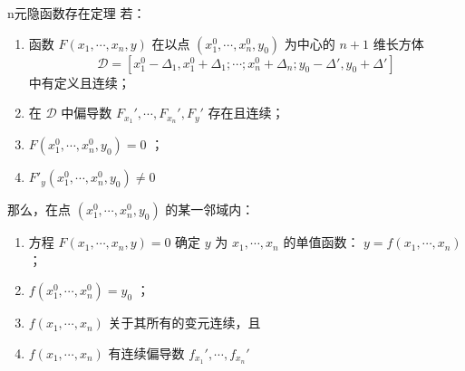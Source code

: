 \begin{theorem}{n元隐函数存在定理}\label{the_Mulmp_1}
若：\begin{enumerate}
\item 函数 $F(x_1,\cdots,x_n,y)$ 在以点 $(x_1^0,\cdots,x_n^0,y_0)$ 为中心的 $n+1$ 维长方体
\begin{equation}
\mathcal{D}=[x_1^0-\Delta_1,x_1^0+\Delta_1;\cdots;x_n^0+\Delta_n;y_0-\Delta',y_0+\Delta']
\end{equation}
中有定义且连续；
\item 在 $\mathcal{D}$ 中偏导数 $F_{x_1}',\cdots,F_{x_n}',F_y'$ 存在且连续；
\item $F(x_1^0,\cdots,x_n^0,y_0)=0$ ；
\item $F'_y(x_1^0,\cdots,x_n^0,y_0)\neq 0$
\end{enumerate}
那么，在点 $(x_1^0,\cdots,x_n^0,y_0)$ 的某一邻域内：
\begin{enumerate}
\item 方程 $F(x_1,\cdots,x_n,y)=0$ 确定 $y$ 为 $x_1,\cdots,x_n$ 的单值函数： $y=f(x_1,\cdots,x_n)$；
\item $f(x_1^0,\cdots,x_n^0)=y_0$ ；
\item $f(x_1,\cdots,x_n)$ 关于其所有的变元连续，且
\item $f(x_1,\cdots,x_n)$ 有连续偏导数 $f_{x_1}',\cdots,f_{x_n}'$
\end{enumerate}
\end{theorem}

